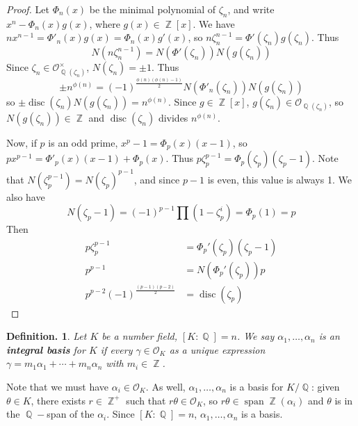\documentclass[11pt, a4paper]{memoir}
\DeclareMathOperator{\Q}{{\mathbb{Q}}}
\DeclareMathOperator{\Z}{{\mathbb{Z}}}
\theoremstyle{change}
\theoremstyle{plain}
\theoremstyle{nonumberplain}
\newtheorem{definition}{Definition.}
\newtheorem{proof}{Proof}
\DeclareMathOperator{\disc}{disc}
\DeclareMathOperator{\spn}{span}
\begin{document}
\begin{proof}
    Let $\Phi_n(x)$ be the minimal polynomial of $\zeta_n$, and write $x^n-\Phi_n(x)g(x)$, where $g(x)\in\Z[x]$.
    We have $nx^{n-1}=\Phi'_n(x)g(x)=\Phi_n(x)g'(x)$, so $n\zeta_n^{n-1}=\Phi'(\zeta_n)g(\zeta_n)$.
    Thus
    \begin{equation*}
        N(n\zeta_n^{n-1})=N(\Phi'(\zeta_n))N(g(\zeta_n))
    \end{equation*}
    Since $\zeta_n\in\mathcal{O}^\times_{\Q(\zeta_n)}$, $N(\zeta_n)=\pm 1$.
    Thus
    \begin{equation*}
        \pm n^{\phi(n)}=(-1)^\frac{\phi(n)(\phi(n)-1)}{2}N(\Phi'_n(\zeta_n))N(g(\zeta_n))
    \end{equation*}
    so $\pm\disc(\zeta_n)N(g(\zeta_n))=n^{\phi(n)}$.
    Since $g\in\Z[x]$, $g(\zeta_n)\in\mathcal{O}_{\Q(\zeta_n)}$, so $N(g(\zeta_n))\in\Z$ and $\disc(\zeta_n)$ divides $n^{\phi(n)}$.

    Now, if $p$ is an odd prime, $x^p-1=\Phi_p(x)(x-1)$, so $px^{p-1}=\Phi'_p(x)(x-1)+\Phi_p(x)$.
    Thus $p\zeta_p^{p-1}=\Phi_p(\zeta_p)(\zeta_p-1)$.
    Note that $N(\zeta_p^{p-1})=N(\zeta_p)^{p-1}$, and since $p-1$ is even, this value is always 1.
    We also have
    \begin{equation*}
        N(\zeta_p-1)=(-1)^{p-1}\prod(1-\zeta_p^i)=\Phi_p(1)=p
    \end{equation*}
    Then
    \begin{align*}
        p\zeta_p^{p-1}&=\Phi_p'(\zeta_p)(\zeta_p-1)\\
        p^{p-1} &= N(\Phi_p'(\zeta_p))p\\
        p^{p-2}(-1)^{\frac{(p-1)(p-2)}{2}}&=\disc(\zeta_p)
    \end{align*}
\end{proof}
\begin{definition}
    Let $K$ be a number field, $[K:\Q]=n$.
    We say $\alpha_1,\ldots,\alpha_n$ is an \textbf{integral basis} for $K$ if every $\gamma\in\mathcal{O}_K$ as a unique expression $\gamma=m_1\alpha_1+\cdots+m_n\alpha_n$ with $m_i\in\Z$.
\end{definition}
Note that we must have $\alpha_i\in\mathcal{O}_K$.
As well, $\alpha_1,\ldots,\alpha_n$ is a basis for $K/\Q$: given $\theta\in K$, there exists $r\in\Z^+$ such that $r\theta\in\mathcal{O}_K$, so $r\theta\in\spn\Z(\alpha_i)$ and $\theta$ is in the $\Q-$span of the $\alpha_i$.
Since $[K:\Q]=n$, $\alpha_1,\ldots,\alpha_n$ is a basis.
\end{document}
